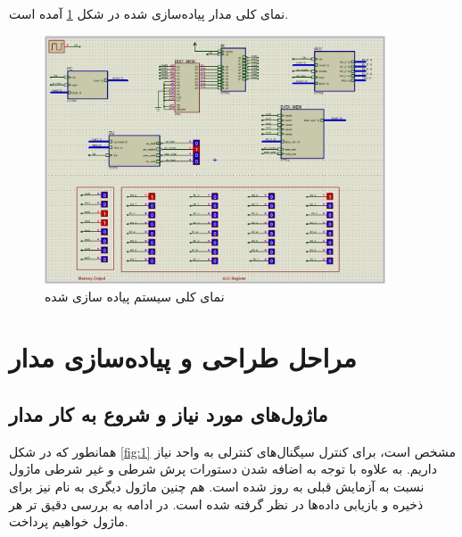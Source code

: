 \documentclass[12pt,onecolumn,a4paper,fleqn]{article}
\begin{document}
نمای کلی مدار پیاده‌سازی شده در شکل \ref{fig:2} آمده است.
\begin{figure}[H]
	\centering
	\includegraphics[width=0.9\textwidth]{source/circuit.png}
	\caption{نمای کلی سیستم پیاده سازی شده}
	\label{fig:2}
\end{figure}

\pagebreak
\section{مراحل طراحی و پیاده‌سازی مدار}
\subsection {ماژول‌های مورد نیاز و شروع به کار مدار}
همانطور که در شکل \ref{fig:1} مشخص است، برای کنترل سیگنال‌های کنترلی به واحد  نیاز داریم. به علاوه با توجه به اضافه شدن دستورات پرش شرطی و غیر شرطی ماژول  نسبت به آزمایش قبلی به روز شده است. هم چنین ماژول دیگری به نام  نیز برای ذخیره و بازیابی داده‌ها در نظر گرفته شده است. در ادامه به بررسی دقیق تر هر ماژول خواهیم پرداخت.
\end{document}
